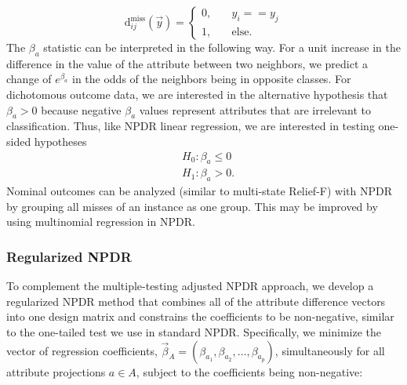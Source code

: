 \documentclass{bioinfo}
\begin{document}
\begin{equation}\label{eq:hitdiff}
\text{d}^{\text{miss}}_{ij}(\vec{y}) = \left\{
    \begin{array}{ll}
        0, & \quad  y_{i} == y_{j} \\
        1, & \quad \text{else}.
    \end{array}
\right.
\end{equation}
The $\beta_a$ statistic can be interpreted in the following way.
For a unit increase in the difference in the value of the attribute between two neighbors, we predict a change of $e^{\beta_a}$ in the odds of the neighbors being in opposite classes.
For dichotomous outcome data, we are interested in the alternative hypothesis that $\beta_a>0$ because negative $\beta_a$ values represent attributes that are irrelevant to classification.
Thus, like NPDR linear regression, we are interested in testing one-sided hypotheses
\begin{equation}
\begin{aligned}
    & H_0: \beta_a \le 0 \\
    & H_1: \beta_a > 0.
\end{aligned}
\end{equation}
Nominal outcomes can be analyzed (similar to multi-state Relief-F) with NPDR by grouping all misses of an instance as one group.
This may be improved by using multinomial regression in NPDR.

\subsubsection{Regularized NPDR}

To complement the multiple-testing adjusted NPDR approach, we develop a regularized NPDR method that combines all of the attribute difference vectors into one design matrix and constrains the coefficients to be non-negative, similar to the one-tailed test we use in standard NPDR.
Specifically, we minimize the vector of regression coefficients, $\vec{\beta}_A = (\beta_{a_1}, \beta_{a_2}, \ldots, \beta_{a_p})$, simultaneously for all attribute projections $a \in A$, subject to the coefficients being non-negative: 
\end{document}
